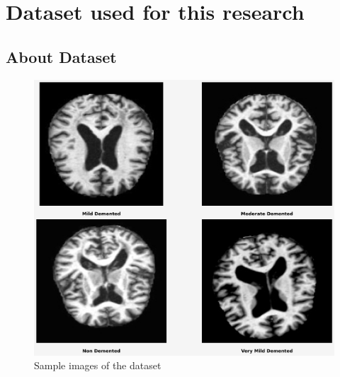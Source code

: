 \documentclass[12pt,onecolumn]{report}
\begin{document}
\section{Dataset used for this research}

\subsection{About Dataset}

\begin{figure}[h!]
    \centering
    \includegraphics[width=0.8\columnwidth]{figures/dataset.png}  %
    \caption{Sample images of the dataset} %
    \label{fig:dataset} %
\end{figure}
\end{document}
